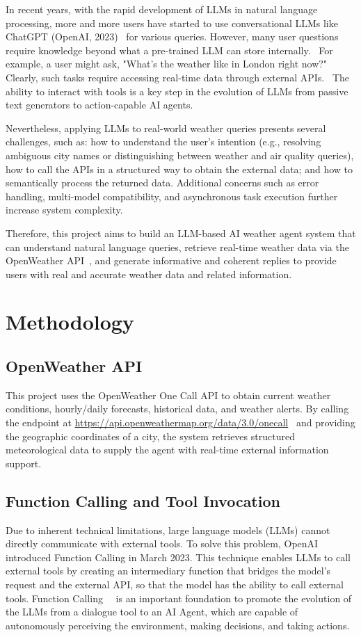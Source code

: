 \documentclass[project-plan]{report-template}
\begin{document}
In recent years, with the rapid development of LLMs in natural language processing, more and more users have started to use conversational LLMs like ChatGPT (OpenAI, 2023)~\cite{OpenAI2023} for various queries. However, many user questions require knowledge beyond what a pre-trained LLM can store internally.~\cite{Zhang2023} For example, a user might ask, "What’s the weather like in London right now?" Clearly, such tasks require accessing real-time data through external APIs.~\cite{Chadha2024} The ability to interact with tools is a key step in the evolution of LLMs from passive text generators to action-capable AI agents.

Nevertheless, applying LLMs to real-world weather queries presents several challenges, such as: how to understand the user's intention (e.g., resolving ambiguous city names or distinguishing between weather and air quality queries), how to call the APIs in a structured way to obtain the external data; and how to semantically process the returned data. Additional concerns such as error handling, multi-model compatibility, and asynchronous task execution further increase system complexity.

Therefore, this project aims to build an LLM-based AI weather agent system that can understand natural language queries, retrieve real-time weather data via the OpenWeather API~\cite{OpenWeatherAPI}, and generate informative and coherent replies to provide users with real and accurate weather data and related information.



\section{Methodology}
\subsection{OpenWeather API}

This project uses the OpenWeather One Call API to obtain current weather conditions, hourly/daily forecasts, historical data, and weather alerts. By calling the endpoint at \url{https://api.openweathermap.org/data/3.0/onecall}~\cite{OpenWeatherAPI} and providing the geographic coordinates of a city, the system retrieves structured meteorological data to supply the agent with real-time external information support.


\subsection{Function Calling and Tool Invocation}
Due to inherent technical limitations, large language models (LLMs) cannot directly communicate with external tools. To solve this problem, OpenAI introduced Function Calling in March 2023. This technique enables LLMs to call external tools by creating an intermediary function that bridges the model’s request and the external API, so that the model has the ability to call external tools. Function Calling~\cite{Liu2024}~\cite{Gim2024} is an important foundation to promote the evolution of the LLMs from a dialogue tool to an AI Agent,  which are capable of autonomously perceiving the environment, making decisions, and taking actions.
\end{document}
